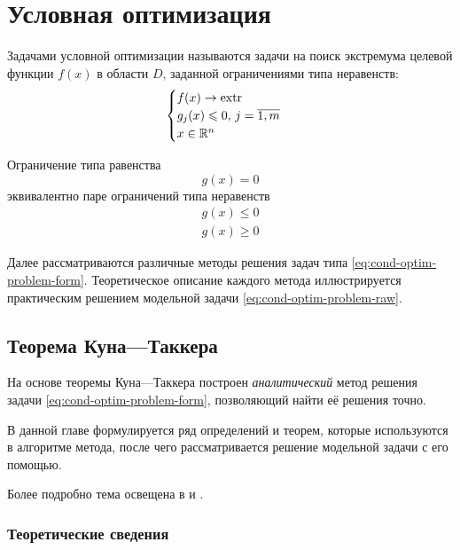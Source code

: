 \section{Условная оптимизация}

Задачами условной оптимизации называются задачи на поиск экстремума
целевой функции $f(x)$ в области $D$, заданной ограничениями типа
неравенств:
\begin{equation}
  \label{eq:cond-optim-problem-form}
  \begin{cases}
    f(x) \to \operatorname{extr} \\
    g_j(x) \leqslant 0,\, j=\overline{1,m} \\
    x \in \mathbb{R}^n
  \end{cases}
\end{equation}

\begin{rem}
  \label{rem:eq-noneq}
  Ограничение типа равенства
  \begin{equation*}
    g(x) = 0
  \end{equation*}
  эквивалентно паре ограничений типа неравенств
  \begin{align*}
    g(x) \leq 0 \\
    g(x) \geq 0
  \end{align*}
\end{rem}

Далее рассматриваются различные методы решения задач типа
\eqref{eq:cond-optim-problem-form}. Теоретическое описание каждого
метода иллюстрируется практическим решением модельной задачи
\eqref{eq:cond-optim-problem-raw}.

\subsection{Теорема Куна—Таккера}
\label{sec:kuhn-tucker}

На основе теоремы Куна—Таккера построен \emph{аналитический} метод
решения задачи \eqref{eq:cond-optim-problem-form}, позволяющий найти
её решения точно. 

В данной главе формулируется ряд определений и теорем, которые
используются в алгоритме метода, после чего рассматривается решение
модельной задачи с его помощью.

Более подробно тема освещена в \cite{alekseev05} и \cite{taha05}.

\subsubsection{Теоретические сведения}

